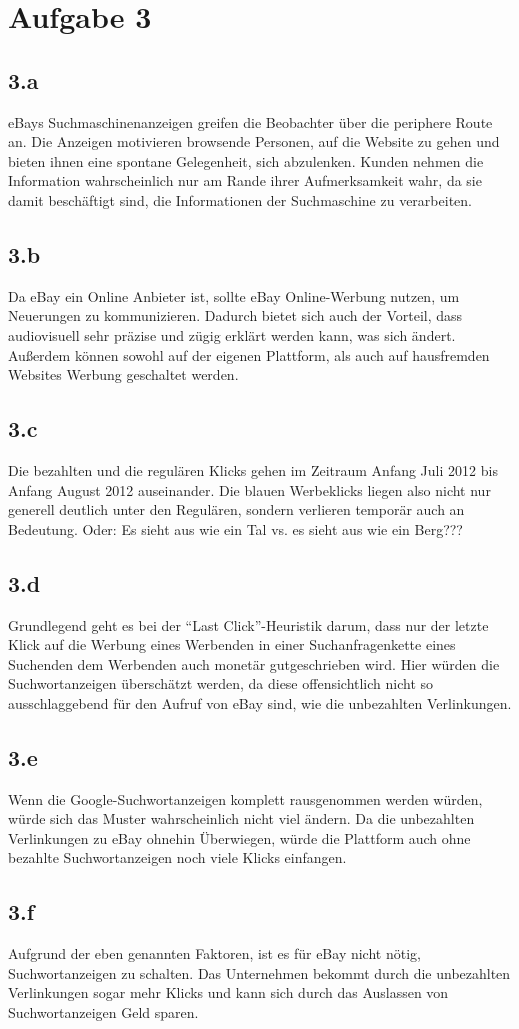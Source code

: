 \documentclass{article}
\begin{document}
\section{Aufgabe 3}
\subsection{3.a} %
eBays Suchmaschinenanzeigen greifen die Beobachter über die periphere Route an. Die Anzeigen motivieren browsende Personen, auf die Website zu gehen und bieten ihnen eine spontane Gelegenheit, sich abzulenken. Kunden nehmen die Information wahrscheinlich nur am Rande ihrer Aufmerksamkeit wahr, da sie damit beschäftigt sind, die Informationen der Suchmaschine zu verarbeiten. 

\subsection{3.b}
Da eBay ein Online Anbieter ist, sollte eBay Online-Werbung nutzen, um Neuerungen zu kommunizieren. Dadurch bietet sich auch der Vorteil, dass audiovisuell sehr präzise und zügig erklärt werden kann, was sich ändert. Außerdem können sowohl auf der eigenen Plattform, als auch auf hausfremden Websites Werbung geschaltet werden.

\subsection{3.c}
Die bezahlten und die regulären Klicks gehen im Zeitraum Anfang Juli 2012 bis Anfang August 2012 auseinander. Die blauen Werbeklicks liegen also nicht nur generell deutlich unter den Regulären, sondern verlieren temporär auch an Bedeutung.
Oder: Es sieht aus wie ein Tal vs. es sieht aus wie ein Berg???

\subsection{3.d}
Grundlegend geht es bei der "`Last Click"'-Heuristik darum, dass nur der letzte Klick auf die Werbung eines Werbenden in einer Suchanfragenkette eines Suchenden dem Werbenden auch monetär gutgeschrieben wird.
Hier würden die Suchwortanzeigen überschätzt werden, da diese offensichtlich nicht so ausschlaggebend für den Aufruf von eBay sind, wie die unbezahlten Verlinkungen.

\subsection{3.e}
Wenn die Google-Suchwortanzeigen komplett rausgenommen werden würden, würde sich das Muster wahrscheinlich nicht viel ändern. Da die unbezahlten Verlinkungen zu eBay ohnehin Überwiegen, würde die Plattform auch ohne bezahlte Suchwortanzeigen noch viele Klicks einfangen.

\subsection{3.f}
Aufgrund der eben genannten Faktoren, ist es für eBay nicht nötig, Suchwortanzeigen zu schalten. Das Unternehmen bekommt durch die unbezahlten Verlinkungen sogar mehr Klicks und kann sich durch das Auslassen von Suchwortanzeigen Geld sparen.
\end{document}
